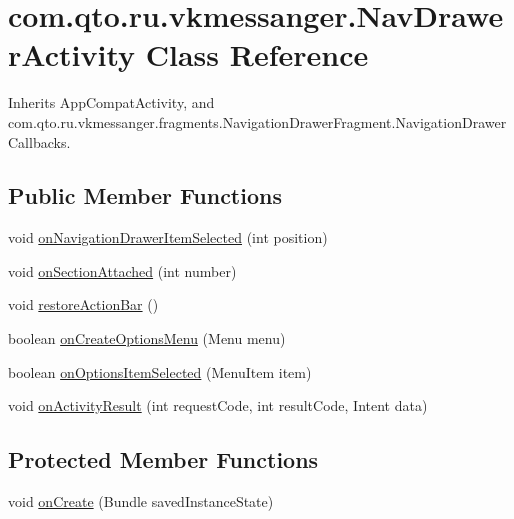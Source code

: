 \hypertarget{classcom_1_1qto_1_1ru_1_1vkmessanger_1_1_nav_drawer_activity}{}\section{com.\+qto.\+ru.\+vkmessanger.\+Nav\+Drawer\+Activity Class Reference}
\label{classcom_1_1qto_1_1ru_1_1vkmessanger_1_1_nav_drawer_activity}


Inherits App\+Compat\+Activity, and com.\+qto.\+ru.\+vkmessanger.\+fragments.\+Navigation\+Drawer\+Fragment.\+Navigation\+Drawer\+Callbacks.

\subsection*{Public Member Functions}
\begin{DoxyCompactItemize}
\item 
void \hyperlink{classcom_1_1qto_1_1ru_1_1vkmessanger_1_1_nav_drawer_activity_aa39572f396895603a47d6705a904fc66}{on\+Navigation\+Drawer\+Item\+Selected} (int position)
\item 
void \hyperlink{classcom_1_1qto_1_1ru_1_1vkmessanger_1_1_nav_drawer_activity_a3750df48358e0e57edab4877bfa16570}{on\+Section\+Attached} (int number)
\item 
void \hyperlink{classcom_1_1qto_1_1ru_1_1vkmessanger_1_1_nav_drawer_activity_a037af8bae9e5c19519329ec9596aac02}{restore\+Action\+Bar} ()
\item 
boolean \hyperlink{classcom_1_1qto_1_1ru_1_1vkmessanger_1_1_nav_drawer_activity_a6d7d243984a73b2bec095162e89dfec5}{on\+Create\+Options\+Menu} (Menu menu)
\item 
boolean \hyperlink{classcom_1_1qto_1_1ru_1_1vkmessanger_1_1_nav_drawer_activity_a2d48b3552ed74bc643187197fa9bda8d}{on\+Options\+Item\+Selected} (Menu\+Item item)
\item 
void \hyperlink{classcom_1_1qto_1_1ru_1_1vkmessanger_1_1_nav_drawer_activity_a146f54057dde6e803c4af5b0e99cbfb0}{on\+Activity\+Result} (int request\+Code, int result\+Code, Intent data)
\end{DoxyCompactItemize}
\subsection*{Protected Member Functions}
\begin{DoxyCompactItemize}
\item 
void \hyperlink{classcom_1_1qto_1_1ru_1_1vkmessanger_1_1_nav_drawer_activity_a15c4594f042b956742e58db7d05849bc}{on\+Create} (Bundle saved\+Instance\+State)
\end{DoxyCompactItemize}



